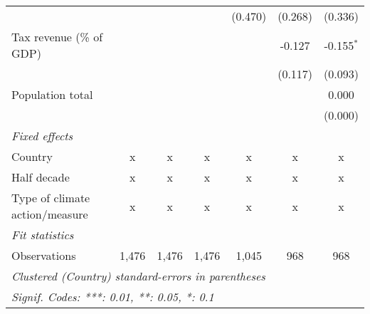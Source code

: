 \begin{tabular}{lcccccc}
                                                              &         &         &               & (0.470)       & (0.268)       & (0.336)\\   
   Tax revenue (\% of GDP)                                    &         &         &               &               & -0.127        & -0.155$^{*}$\\   
                                                              &         &         &               &               & (0.117)       & (0.093)\\   
   Population total                                           &         &         &               &               &               & 0.000\\   
                                                              &         &         &               &               &               & (0.000)\\   
   \emph{Fixed effects}\\
   Country                                                    & x       & x       & x             & x             & x             & x\\  
   Half decade                                                & x       & x       & x             & x             & x             & x\\  
   Type of climate action/measure                             & x       & x       & x             & x             & x             & x\\  
   \midrule \emph{Fit statistics}\\
   Observations                                               & 1,476   & 1,476   & 1,476         & 1,045         & 968           & 968\\  
   \midrule
   \multicolumn{7}{l}{\emph{Clustered (Country) standard-errors in parentheses}}\\
   \multicolumn{7}{l}{\emph{Signif. Codes: ***: 0.01, **: 0.05, *: 0.1}}\\
\end{tabular}
\par\endgroup


